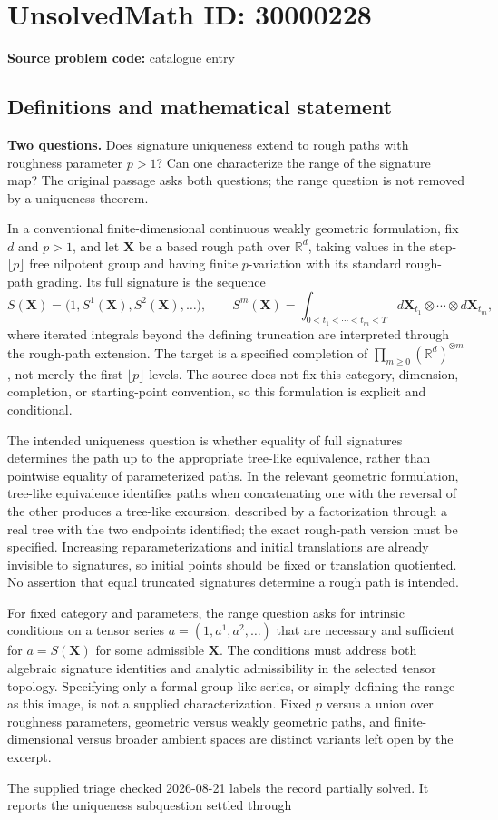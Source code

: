\documentclass[11pt]{article}
\newcommand{\R}{\mathbb{R}}
\begin{document}
\section*{UnsolvedMath ID: 30000228}
\textbf{Source problem code:} catalogue entry
\subsection{Definitions and mathematical statement}
\textbf{Two questions.} Does signature uniqueness extend to rough paths with roughness parameter \(p>1\)? Can one characterize the range of the signature map? The original passage asks both questions; the range question is not removed by a uniqueness theorem.\par In a conventional finite-dimensional continuous weakly geometric formulation, fix \(d\) and \(p>1\), and let \(\mathbf X\) be a based rough path over \(\R^d\), taking values in the step-\(\lfloor p\rfloor\) free nilpotent group and having finite \(p\)-variation with its standard rough-path grading. Its full signature is the sequence\[S(\mathbf X)=\bigl(1,S^1(\mathbf X),S^2(\mathbf X),\ldots\bigr),\qquad S^m(\mathbf X)=\int_{0<t_1<\cdots<t_m<T}d\mathbf X_{t_1}\otimes\cdots\otimes d\mathbf X_{t_m},\] where iterated integrals beyond the defining truncation are interpreted through the rough-path extension. The target is a specified completion of \(\prod_{m\ge0}(\R^d)^{\otimes m}\), not merely the first \(\lfloor p\rfloor\) levels. The source does not fix this category, dimension, completion, or starting-point convention, so this formulation is explicit and conditional.\par The intended uniqueness question is whether equality of full signatures determines the path up to the appropriate tree-like equivalence, rather than pointwise equality of parameterized paths. In the relevant geometric formulation, tree-like equivalence identifies paths when concatenating one with the reversal of the other produces a tree-like excursion, described by a factorization through a real tree with the two endpoints identified; the exact rough-path version must be specified. Increasing reparameterizations and initial translations are already invisible to signatures, so initial points should be fixed or translation quotiented. No assertion that equal truncated signatures determine a rough path is intended.\par For fixed category and parameters, the range question asks for intrinsic conditions on a tensor series \(a=(1,a^1,a^2,\ldots)\) that are necessary and sufficient for \(a=S(\mathbf X)\) for some admissible \(\mathbf X\). The conditions must address both algebraic signature identities and analytic admissibility in the selected tensor topology. Specifying only a formal group-like series, or simply defining the range as this image, is not a supplied characterization. Fixed \(p\) versus a union over roughness parameters, geometric versus weakly geometric paths, and finite-dimensional versus broader ambient spaces are distinct variants left open by the excerpt.\par The supplied triage checked 2026-08-21 labels the record partially solved. It reports the uniqueness subquestion settled through 
\end{document}
